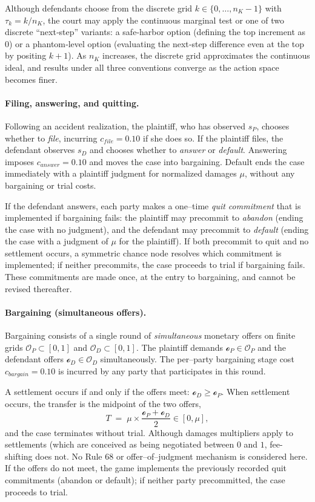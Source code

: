 \documentclass{article}
\begin{document}
Although defendants choose from the discrete grid $k\in\{0,\dots,n_K-1\}$ with $\tau_k=k/n_K$, the court may apply the continuous marginal test or one of two discrete “next‑step” variants: a safe‑harbor option (defining the top increment as $0$) or a phantom‑level option (evaluating the next‑step difference even at the top by positing $k+1$). As $n_K$ increases, the discrete grid approximates the continuous ideal, and results under all three conventions converge as the action space becomes finer.


\paragraph{Filing, answering, and quitting.}
Following an accident realization, the plaintiff, who has observed $s_P$, chooses whether to \emph{file}, incurring $c_{file}=0.10$ if she does so. If the plaintiff files, the defendant observes $s_D$ and chooses whether to \emph{answer} or \emph{default}. Answering imposes $c_{answer}=0.10$ and moves the case into bargaining. Default ends the case immediately with a plaintiff judgment for normalized damages $\mu$, without any bargaining or trial costs.

If the defendant answers, each party makes a one–time \emph{quit commitment} that is implemented if bargaining fails: the plaintiff may precommit to \emph{abandon} (ending the case with no judgment), and the defendant may precommit to \emph{default} (ending the case with a judgment of $\mu$ for the plaintiff). If both precommit to quit and no settlement occurs, a symmetric chance node resolves which commitment is implemented; if neither precommits, the case proceeds to trial if bargaining fails. These commitments are made once, at the entry to bargaining, and cannot be revised thereafter.

\paragraph{Bargaining (simultaneous offers).}
Bargaining consists of a single round of \emph{simultaneous} monetary offers on finite grids $\mathcal{O}_P\subset[0,1]$ and $\mathcal{O}_D\subset[0,1]$. The plaintiff demands $\mathcal{o}_P\in\mathcal{O}_P$ and the defendant offers $\mathcal{o}_D\in\mathcal{O}_D$ simultaneously. The per–party bargaining stage cost $c_{bargain}=0.10$ is incurred by any party that participates in this round.

A settlement occurs if and only if the offers meet: $\mathcal{o}_D\ge \mathcal{o}_P$. When settlement occurs, the transfer is the midpoint of the two offers,
\[
T \;=\; \mu \times \frac{\mathcal{o}_P+\mathcal{o}_D}{2}\in[0,\mu],
\]
and the case terminates without trial. Although damages multipliers apply to settlements (which are conceived as being negotiated between $0$ and $1$, fee-shifting does not. No Rule 68 or offer–of–judgment mechanism is considered here. If the offers do not meet, the game implements the previously recorded quit commitments (abandon or default); if neither party precommitted, the case proceeds to trial.
\end{document}
